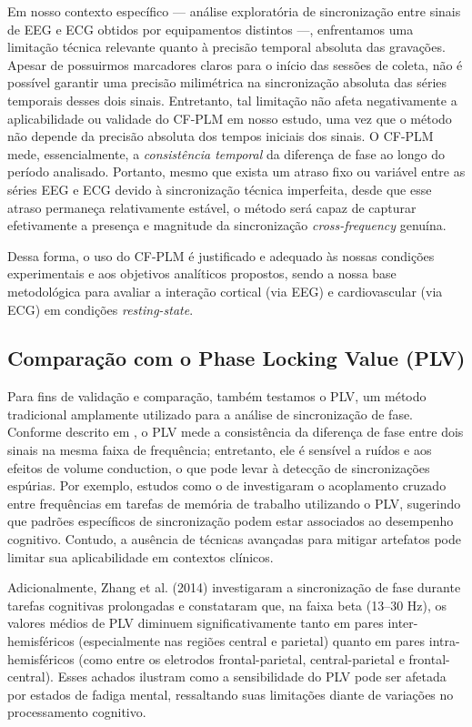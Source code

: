 Em nosso contexto específico — análise exploratória de sincronização entre sinais de EEG e ECG obtidos por equipamentos distintos —, enfrentamos uma limitação técnica relevante quanto à precisão temporal absoluta das gravações. Apesar de possuirmos marcadores claros para o início das sessões de coleta, não é possível garantir uma precisão milimétrica na sincronização absoluta das séries temporais desses dois sinais. Entretanto, tal limitação não afeta negativamente a aplicabilidade ou validade do CF-PLM em nosso estudo, uma vez que o método não depende da precisão absoluta dos tempos iniciais dos sinais. O CF-PLM mede, essencialmente, a \textit{consistência temporal} da diferença de fase ao longo do período analisado. Portanto, mesmo que exista um atraso fixo ou variável entre as séries EEG e ECG devido à sincronização técnica imperfeita, desde que esse atraso permaneça relativamente estável, o método será capaz de capturar efetivamente a presença e magnitude da sincronização \textit{cross-frequency} genuína.

Dessa forma, o uso do CF-PLM é justificado e adequado às nossas condições experimentais e aos objetivos analíticos propostos, sendo a nossa base metodológica para avaliar a interação cortical (via EEG) e cardiovascular (via ECG) em condições \textit{resting-state}.


\subsection{Comparação com o Phase Locking Value (PLV)}

Para fins de validação e comparação, também testamos o PLV, um método tradicional amplamente utilizado para a análise de sincronização de fase. Conforme descrito em \cite{seraj2018cerebral}, o PLV mede a consistência da diferença de fase entre dois sinais na mesma faixa de frequência; entretanto, ele é sensível a ruídos e aos efeitos de volume conduction, o que pode levar à detecção de sincronizações espúrias. Por exemplo, estudos como o de \cite{abubaker2021working} investigaram o acoplamento cruzado entre frequências em tarefas de memória de trabalho utilizando o PLV, sugerindo que padrões específicos de sincronização podem estar associados ao desempenho cognitivo. Contudo, a ausência de técnicas avançadas para mitigar artefatos pode limitar sua aplicabilidade em contextos clínicos.

Adicionalmente, Zhang et al. (2014) \cite{zhang2014phase} investigaram a sincronização de fase durante tarefas cognitivas prolongadas e constataram que, na faixa beta (13--30 Hz), os valores médios de PLV diminuem significativamente tanto em pares inter-hemisféricos (especialmente nas regiões central e parietal) quanto em pares intra-hemisféricos (como entre os eletrodos frontal-parietal, central-parietal e frontal-central). Esses achados ilustram como a sensibilidade do PLV pode ser afetada por estados de fadiga mental, ressaltando suas limitações diante de variações no processamento cognitivo.


